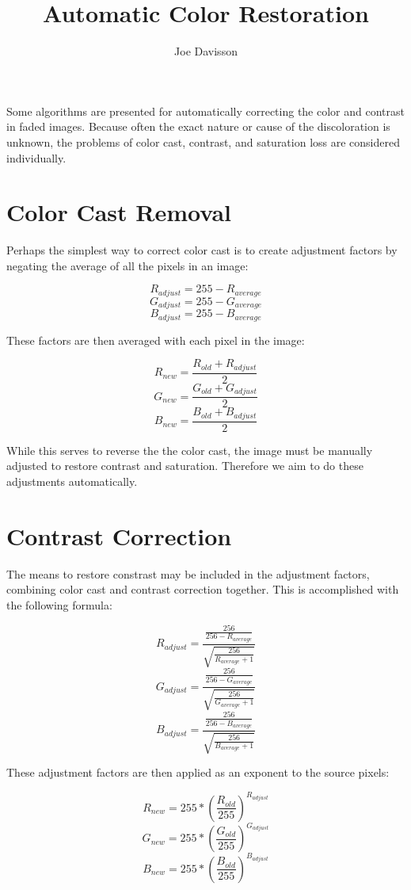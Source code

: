 \documentclass{article}
\title{Automatic Color Restoration}
\author{Joe Davisson} %
\begin{document}
\maketitle

Some algorithms are presented for automatically correcting the
color and contrast in faded images. Because often the exact nature or cause
of the discoloration is unknown, the problems of color cast, contrast, and
saturation loss are considered individually.

\section{Color Cast Removal}

Perhaps the simplest way to correct color cast is to create adjustment
factors by negating the average of all the pixels in an image:

\[ R_{adjust} = 255 - R_{average} \]
\[ G_{adjust} = 255 - G_{average} \]
\[ B_{adjust} = 255 - B_{average} \]

These factors are then averaged with each pixel in the image:

\[ R_{new} = \frac{R_{old} + R_{adjust} } { 2 } \]
\[ G_{new} = \frac{G_{old} + G_{adjust} } { 2 } \]
\[ B_{new} = \frac{B_{old} + B_{adjust} } { 2 } \]

While this serves to reverse the the color cast, the image must be manually
adjusted to restore contrast and saturation. Therefore we aim to do these
adjustments automatically.

\section{Contrast Correction}

The means to restore constrast may be included in the adjustment factors,
combining color cast and contrast correction together. This is accomplished
with the following formula:

\[ R_{adjust} = \frac{\frac{256} {256 - R_{average}}}
                     {\sqrt{\frac{256} { R_{average} + 1}}} \]
\[ G_{adjust} = \frac{\frac{256} {256 - G_{average}}}
                     {\sqrt{\frac{256} { G_{average} + 1}}} \]
\[ B_{adjust} = \frac{\frac{256} {256 - B_{average}}}
                     {\sqrt{\frac{256} { B_{average} + 1}}} \]

These adjustment factors are then applied as an exponent to the source pixels:

\[ R_{new} = 255 * (\frac{ R_{old}}{255}) ^ {R_{adjust}} \]
\[ G_{new} = 255 * (\frac{ G_{old}}{255}) ^ {G_{adjust}} \]
\[ B_{new} = 255 * (\frac{ B_{old}}{255}) ^ {B_{adjust}} \]
\end{document}
